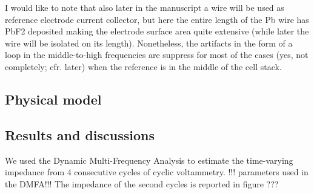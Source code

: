 I would like to note that also later in the manuscript a wire will be used as reference electrode current collector, but here the entire length of the Pb wire has PbF2 deposited making the electrode surface area quite extensive (while later the wire will be isolated on its length). Nonetheless, the artifacts in the form of a loop in the middle-to-high frequencies are suppress for most of the cases (yes, not completely; cfr. later)  when the reference is in the middle of the cell stack.

\subsection{Physical model}

\subsection{Results and discussions}
We used the Dynamic Multi-Frequency Analysis to estimate the time-varying impedance from 4 consecutive cycles of cyclic voltammetry. !!! parameters used in the DMFA!!! The impedance of the second cycles is reported in figure ???

